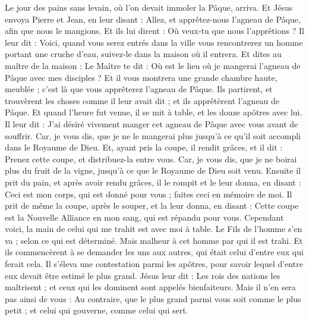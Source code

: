 \begin{multicols}{2}
Le jour des pains sans levain, où l'on devait immoler la Pâque, arriva.
Et Jésus envoya Pierre et Jean, en leur disant : Allez, et apprêtez-nous l'agneau de Pâque, afin que nous le mangions.
Et ils lui dirent : Où veux-tu que nous l'apprêtions ?
Il leur dit : Voici, quand vous serez entrés dans la ville vous rencontrerez un homme portant une cruche d'eau, suivez-le dans la maison où il entrera.
Et dites au maître de la maison : Le Maître te dit : Où est le lieu où je mangerai l'agneau de Pâque avec mes disciples ?
Et il vous montrera une grande chambre haute, meublée ; c'est là que vous apprêterez l'agneau de Pâque.
Ils partirent, et trouvèrent les choses comme il leur avait dit ; et ils apprêtèrent l'agneau de Pâque.
Et quand l'heure fut venue, il se mit à table, et les douze apôtres avec lui.
Il leur dit : J'ai désiré vivement manger cet agneau de Pâque avec vous avant de souffrir.
Car, je vous dis, que je ne le mangerai plus jusqu'à ce qu'il soit accompli dans le Royaume de Dieu.
Et, ayant pris la coupe, il rendit grâces, et il dit : Prenez cette coupe, et distribuez-la entre vous.
Car, je vous dis, que je ne boirai plus du fruit de la vigne, jusqu'à ce que le Royaume de Dieu soit venu.
Ensuite il prit du pain, et après avoir rendu grâces, il le rompit et le leur donna, en disant : Ceci est mon corps, qui est donné pour vous ; faites ceci en mémoire de moi.
Il prit de même la coupe, après le souper, et la leur donna, en disant : Cette coupe est la Nouvelle Alliance en mon sang, qui est répandu pour vous.
Cependant voici, la main de celui qui me trahit est avec moi à table.
Le Fils de l'homme s'en va ; selon ce qui est déterminé. Mais malheur à cet homme par qui il est trahi.
Et ils commencèrent à se demander les uns aux autres, qui était celui d'entre eux qui ferait cela.
Il s'éleva une contestation parmi les apôtres, pour savoir lequel d'entre eux devait être estimé le plus grand.
Jésus leur dit : Les rois des nations les maîtrisent ; et ceux qui les dominent sont appelés bienfaiteurs.
Mais il n'en sera pas ainsi de vous : Au contraire, que le plus grand parmi vous soit comme le plus petit ; et celui qui gouverne, comme celui qui sert.

\end{multicols}
